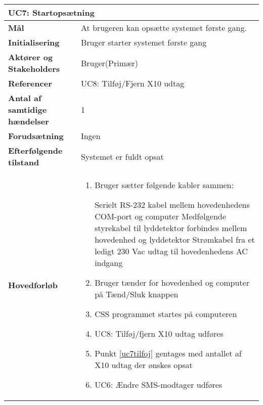 \begin{table}[H] \centering
	\begin{tabular}{|p{6cm}|p{8cm}|}
	\hline
		\multicolumn{2}{|l|}{\textbf{UC7: Startopsætning}} \\\hline
		
		\textbf{Mål}							&At brugeren kan opsætte systemet første gang.					\\\hline
		\textbf{Initialisering}				&Bruger	starter systemet første gang				 										\\\hline
		\textbf{Aktører og Stakeholders}		&Bruger(Primær)			\\\hline
		\textbf{Referencer}					&UC8: Tilføj/Fjern X10 udtag										\\\hline
		\textbf{Antal af samtidige hændelser}&1 																\\\hline
		\textbf{Forudsætning}				&Ingen															\\\hline
		\textbf{Efterfølgende tilstand}		&Systemet er fuldt opsat											\\\hline
		\textbf{Hovedforløb}					
			&\begin{enumerate}
	
				\item Bruger sætter følgende kabler sammen:
				
					\subitem Serielt RS-232 kabel mellem hovedenhedens COM-port og computer
					\subitem Medfølgende styrekabel til lyddetektor forbindes mellem hovedenhed og lyddetektor
					\subitem Strømkabel fra et ledigt 230 Vac udtag til hovedenhedens AC indgang
				
				\item Bruger tænder for hovedenhed og computer på Tænd/Sluk knappen
				
				\item CSS programmet startes på computeren
				
				\item \label{uc7tilfoj} UC8: Tilføj/fjern X10 udtag udføres
				
				\item Punkt \ref{uc7tilfoj} gentages med antallet af X10 udtag der ønskes opsat
				
				\item \label{uc7sms} UC6: Ændre SMS-modtager udføres
																													
			\end{enumerate}\\\hline
											
	\end{tabular}
	\label{UC7} 
\end{table}